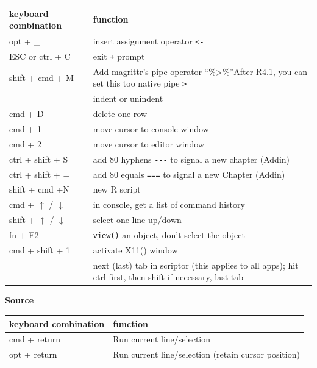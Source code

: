 \documentclass[
  a4paper,
  twoside,
  openright]{book}
\theoremstyle{definition}
\theoremstyle{definition}
\theoremstyle{definition}
\theoremstyle{definition}
\theoremstyle{remark}
\begin{document}
\begin{longtable}[]{@{}
  >{\raggedright\arraybackslash}p{}
  >{\raggedright\arraybackslash}p{}@{}}
\toprule\noalign{}
\begin{minipage}[b]{\linewidth}\raggedright
keyboard combination
\end{minipage} & \begin{minipage}[b]{\linewidth}\raggedright
function
\end{minipage} \\
\midrule\noalign{}
\endhead
\bottomrule\noalign{}
\endlastfoot
opt + \_ & insert assignment operator \texttt{\textless{}-} \\
ESC or ctrl + C & exit \texttt{+} prompt \\
shift + cmd + M & Add magrittr's pipe operator ``\%\textgreater\%''After R4.1, you can set this too native pipe \texttt{\textbar{}\textgreater{}} \\
{ctrl + \texttt{{[}}/\texttt{{]}}} & indent or unindent \\
cmd + D & delete one row \\
cmd + 1 & move cursor to console window \\
cmd + 2 & move cursor to editor window \\
ctrl + shift + S & add 80 hyphens \texttt{-\/-\/-} to signal a new chapter (Addin) \\
ctrl + shift + = & add 80 equals \texttt{===} to signal a new Chapter (Addin) \\
shift + cmd +N & new R script \\
cmd + \(\uparrow\) / \(\downarrow\) & in console, get a list of command history \\
shift + \(\uparrow\) / \(\downarrow\) & select one line up/down \\
fn + F2 & \texttt{view()} an object, don't select the object \\
cmd + shift + 1 & activate X11() window \\
{ctrl (+ shift) + tab} & next (last) tab in scriptor (this applies to all apps); hit ctrl first, then shift if necessary, last tab \\
\end{longtable}

{\textbf{Source}}

\begin{longtable}[]{@{}
  >{\raggedright\arraybackslash}p{}
  >{\raggedright\arraybackslash}p{}@{}}
\toprule\noalign{}
\begin{minipage}[b]{\linewidth}\raggedright
keyboard combination
\end{minipage} & \begin{minipage}[b]{\linewidth}\raggedright
function
\end{minipage} \\
\midrule\noalign{}
\endhead
\bottomrule\noalign{}
\endlastfoot
cmd + return & Run current line/selection \\
opt + return & Run current line/selection (retain cursor position) \\
\end{longtable}
\end{document}
